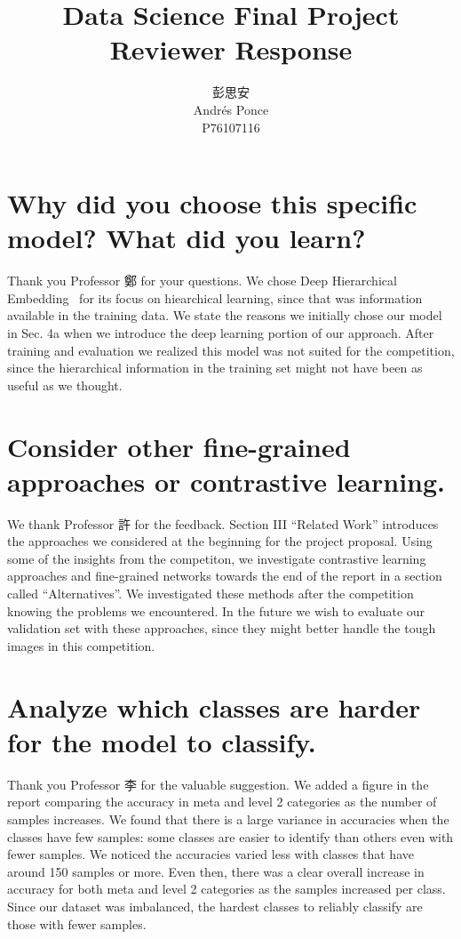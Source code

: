 \documentclass{article}
\title{Data Science Final Project Reviewer Response}
\author{彭思安 \\
Andr\'es Ponce\\
P76107116
}
\begin{document}
\maketitle
\section{Why did you choose this specific model? What did you learn?}
Thank you Professor 鄭 for your questions.
We chose Deep Hierarchical Embedding~\cite{gao2020deep} for its focus on hiearchical learning, since that
was information available in the training data.
We state the reasons we initially chose our model in Sec. 4a when we introduce the deep learning portion of our approach.
After training and evaluation we realized this model was not suited for the competition, since the hierarchical
information in the training set might not have been as useful as we thought.


\section{Consider other fine-grained approaches or contrastive learning.}
We thank Professor 許 for the feedback.
Section III ``Related Work'' introduces the approaches we considered at the beginning for the project proposal.
Using some of the insights from the competiton, we investigate contrastive learning approaches and 
fine-grained networks towards the end of the report in a 
section called ``Alternatives''. 
We investigated these methods after the competition knowing the problems we encountered.
In the future we wish to evaluate our validation set with these approaches, since they might better handle the tough 
images in this competition.

\section{Analyze which classes are harder for the model to classify.}
Thank you Professor 李 for the valuable suggestion.
We added a figure in the report comparing the accuracy in meta and level 2 categories as the number of samples increases.
We found that there is a large variance in accuracies when the classes have few samples: some classes are easier to identify 
than others even with fewer samples.
We noticed the accuracies varied less with classes that have around 150 samples or more.
Even then, there was a clear overall increase in accuracy for both meta and level 2 categories as the samples increased per class.
Since our dataset was imbalanced, the hardest classes to reliably classify are those with fewer samples.

\printbibliography
\end{document}
